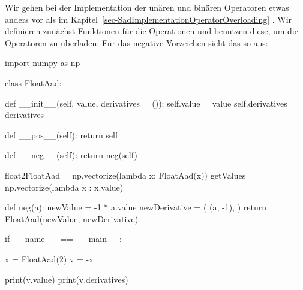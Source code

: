 \documentclass[
  a4paper,
  DIV=11]{scrreprt}
\newenvironment{Shaded}{\begin{snugshade}}{\end{snugshade}}
\newcommand{\BuiltInTok}[1]{\textcolor[rgb]{0.00,0.23,0.31}{#1}}
\newcommand{\ControlFlowTok}[1]{\textcolor[rgb]{0.00,0.23,0.31}{#1}}
\newcommand{\DecValTok}[1]{\textcolor[rgb]{0.68,0.00,0.00}{#1}}
\newcommand{\FunctionTok}[1]{\textcolor[rgb]{0.28,0.35,0.67}{#1}}
\newcommand{\ImportTok}[1]{\textcolor[rgb]{0.00,0.46,0.62}{#1}}
\newcommand{\KeywordTok}[1]{\textcolor[rgb]{0.00,0.23,0.31}{#1}}
\newcommand{\NormalTok}[1]{\textcolor[rgb]{0.00,0.23,0.31}{#1}}
\newcommand{\OperatorTok}[1]{\textcolor[rgb]{0.37,0.37,0.37}{#1}}
\newcommand{\StringTok}[1]{\textcolor[rgb]{0.13,0.47,0.30}{#1}}
\newcommand{\VariableTok}[1]{\textcolor[rgb]{0.07,0.07,0.07}{#1}}
\theoremstyle{definition}
\theoremstyle{definition}
\theoremstyle{remark}
\begin{document}
Wir gehen bei der Implementation der unären und binären Operatoren etwas
anders vor als im Kapitel~\ref{sec-SadImplementationOperatorOverloading}
. Wir definieren zunächst Funktionen für die Operationen und benutzen
diese, um die Operatoren zu überladen. Für das negative Vorzeichen sieht
das so aus:

\begin{Shaded}
\begin{Highlighting}[]
\ImportTok{import}\NormalTok{ numpy }\ImportTok{as}\NormalTok{ np}

\KeywordTok{class}\NormalTok{ FloatAad:}

    \KeywordTok{def} \FunctionTok{\_\_init\_\_}\NormalTok{(}\VariableTok{self}\NormalTok{, value, derivatives }\OperatorTok{=}\NormalTok{ ()):}
        \VariableTok{self}\NormalTok{.value }\OperatorTok{=}\NormalTok{ value}
        \VariableTok{self}\NormalTok{.derivatives }\OperatorTok{=}\NormalTok{ derivatives}

    \KeywordTok{def} \FunctionTok{\_\_pos\_\_}\NormalTok{(}\VariableTok{self}\NormalTok{):}
        \ControlFlowTok{return} \VariableTok{self}

    \KeywordTok{def} \FunctionTok{\_\_neg\_\_}\NormalTok{(}\VariableTok{self}\NormalTok{):}
        \ControlFlowTok{return}\NormalTok{ neg(}\VariableTok{self}\NormalTok{)}

\NormalTok{float2FloatAad }\OperatorTok{=}\NormalTok{ np.vectorize(}\KeywordTok{lambda}\NormalTok{ x: FloatAad(x))}
\NormalTok{getValues }\OperatorTok{=}\NormalTok{ np.vectorize(}\KeywordTok{lambda}\NormalTok{ x : x.value)}

\KeywordTok{def}\NormalTok{ neg(a):}
\NormalTok{    newValue }\OperatorTok{=} \OperatorTok{{-}}\DecValTok{1} \OperatorTok{*}\NormalTok{ a.value}
\NormalTok{    newDerivative }\OperatorTok{=}\NormalTok{ (}
\NormalTok{        (a, }\OperatorTok{{-}}\DecValTok{1}\NormalTok{),}
\NormalTok{    )}
    \ControlFlowTok{return}\NormalTok{ FloatAad(newValue, newDerivative)}


\ControlFlowTok{if} \VariableTok{\_\_name\_\_} \OperatorTok{==} \StringTok{\textquotesingle{}\_\_main\_\_\textquotesingle{}}\NormalTok{:}

\NormalTok{    x }\OperatorTok{=}\NormalTok{ FloatAad(}\DecValTok{2}\NormalTok{)}
\NormalTok{    v }\OperatorTok{=} \OperatorTok{{-}}\NormalTok{x}

    \BuiltInTok{print}\NormalTok{(v.value)}
    \BuiltInTok{print}\NormalTok{(v.derivatives)}
\end{Highlighting}
\end{Shaded}
\end{document}

